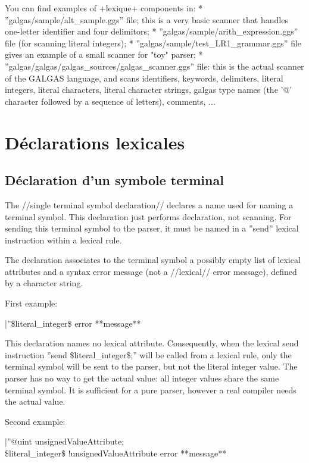 You can find examples of \ggs+lexique+ components in:
  * ''galgas/sample/alt\_sample.ggs'' file; this is a very basic scanner that handles one-letter identifier and four delimitors;
  * ''galgas/sample/arith\_expression.ggs'' file (for scanning literal integers); 
  * ''galgas/sample/test\_LR1\_grammar.ggs'' file gives an example of a small scanner for "toy" parser;
  * ''galgas/galgas/galgas\_sources/galgas\_scanner.ggs'' file: this is the actual scanner of the GALGAS language, and scans identifiers, keywords, delimiters, literal integers, literal characters, literal character strings, galgas type names (the '@' character followed by a sequence of letters), comments, ...   

\section{Déclarations lexicales}

\subsection{Déclaration d'un symbole terminal}

The //single terminal symbol declaration// declares a name used for naming a terminal symbol. This declaration just performs declaration, not scanning. For sending this terminal symbol to the parser, it must be named in a ''send'' lexical instruction within a lexical rule.

The declaration associates to the terminal symbol a possibly empty list of lexical attributes and a syntax error message (not a //lexical// error message), defined by a character string.

First example:

|''\$literal\_integer\$ error **message** %

This declaration names no lexical attribute. Consequently, when the lexical send instruction ''send \$literal\_integer\$;'' will be called from a lexical rule, only the terminal symbol will be sent to the parser, but not the literal integer value. The parser has no way to get the actual value: all integer values share the same terminal symbol. It is sufficient for a pure parser, however a real compiler needs the actual value.

Second example:

|''@uint unsignedValueAttribute;\\ 
\$literal\_integer\$ !unsignedValueAttribute error **message** %

